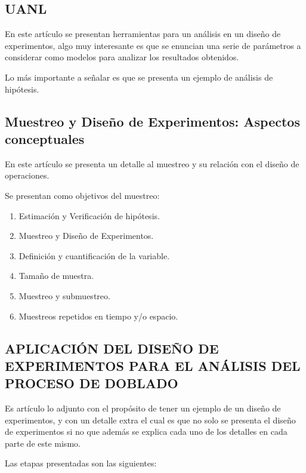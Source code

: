 \documentclass{article}
\begin{document}
\newpage
\subsection*{UANL}
En este artículo se presentan herramientas para un análisis en un diseño de experimentos, algo muy interesante es que se enuncian una serie de parámetros a considerar como modelos para analizar los resultados obtenidos.

Lo más importante a señalar es que se presenta un ejemplo de análisis de hipótesis.

\subsection*{Muestreo y Diseño de Experimentos: Aspectos conceptuales}

En este artículo se presenta un detalle al muestreo y su relación con el diseño de operaciones.

Se presentan como objetivos del muestreo:

\begin{enumerate}
  \item Estimación y Verificación de hipótesis.
  \item Muestreo y Diseño de Experimentos.
  \item Definición y cuantificación de la variable.
  \item Tamaño de muestra.
  \item Muestreo y submuestreo.
  \item Muestreos repetidos en tiempo y/o espacio.
\end{enumerate}

\subsection*{APLICACIÓN DEL DISEÑO DE EXPERIMENTOS PARA EL
ANÁLISIS DEL PROCESO DE DOBLADO}

Es artículo lo adjunto con el propósito de tener un ejemplo de un diseño de experimentos, y con un detalle extra el cual es que no solo se presenta el diseño de experimentos si no que además se explica cada uno de los detalles en cada parte de este mismo.

Las etapas presentadas son las siguientes:
\end{document}
